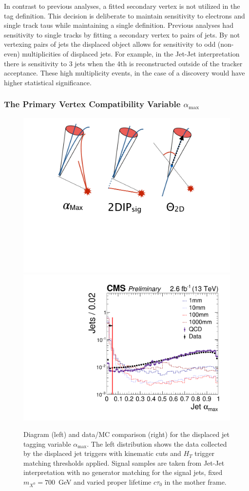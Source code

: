 In contrast to previous analyses, a fitted secondary vertex is not utilized in the tag definition. This decision is deliberate to maintain sensitivity to
electrons and single track taus while maintaining a single definition. Previous analyses had sensitivity to single tracks  by fitting a secondary vertex 
to pairs of jets. By not vertexing pairs of jets the displaced object allows for sensitivity to odd (non-even) multiplicities of displaced jets. For example,
in the Jet-Jet interpretation there is sensitivity to 3 jets when the 4th is reconstructed outside of the tracker acceptance. These high multiplicity events,
in the case of a discovery would have higher statistical significance.

\subsubsection{The Primary Vertex Compatibility Variable $\alpha_{\textrm{max}}$}

\begin{figure}
\begin{center}
\includegraphics[width=.20\textwidth]{figures/pas/DIAGRAMS/alpha_diag.pdf}
\includegraphics[width=.5\textwidth]{figures/pas/SELECTION/76x_pu/DJET_alphaMax.pdf}
\caption{Diagram (left) and data/MC comparison (right) for the displaced jet tagging variable $\alpha_{\textrm{max}}$. The left distribution  shows the data collected by the displaced jet triggers with kinematic cuts and $H_T$ trigger matching thresholds applied. Signal samples are taken from Jet-Jet interpretation with no generator matching for the signal jets, fixed $m_{X^0}=700$~GeV and varied proper lifetime $c\tau_0$ in the mother frame.  
  \label{fig:alphaMax}}
\end{center}
\end{figure}

